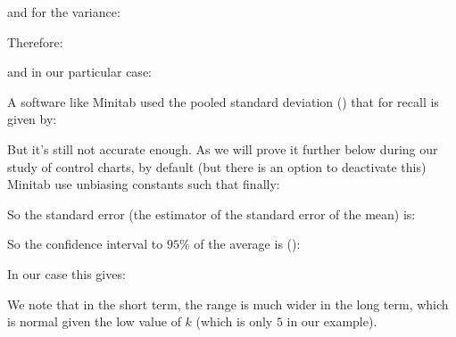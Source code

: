	\pagebreak
	\begin{tcolorbox}[colframe=black,colback=white,sharp corners]
	and for the variance:
		
	Therefore:
	
	and in our particular case:
	
	\begin{tcolorbox}[title=Remark,colframe=black,arc=10pt]
	A software like Minitab used the pooled standard deviation () that for recall is given by:
	
	But it's still not accurate enough. As we will prove it further below during our study of control charts, by default (but there is an option to deactivate this) Minitab use unbiasing constants such that finally:
	
	\end{tcolorbox}
	So the standard error (the estimator of the standard error of the mean) is:
	
	So the confidence interval to $95\%$ of the average is ():
	
	In our case this gives:
	
	We note that in the short term, the range is much wider in the long term, which is normal given the low value of $k$ (which is only $5$ in our example).
	\end{tcolorbox}
	

